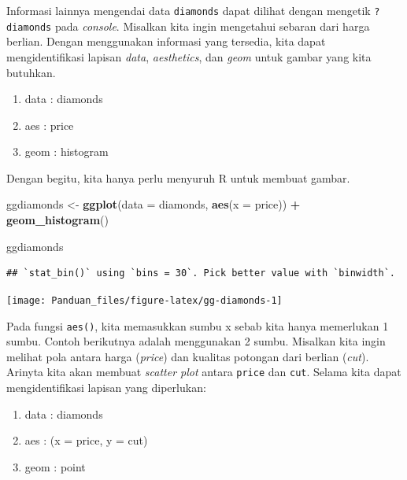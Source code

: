 \documentclass[]{book}
\newenvironment{Shaded}{\begin{snugshade}}{\end{snugshade}}
\newcommand{\KeywordTok}[1]{\textcolor[rgb]{0.13,0.29,0.53}{\textbf{#1}}}
\newcommand{\DataTypeTok}[1]{\textcolor[rgb]{0.13,0.29,0.53}{#1}}
\newcommand{\StringTok}[1]{\textcolor[rgb]{0.31,0.60,0.02}{#1}}
\newcommand{\OperatorTok}[1]{\textcolor[rgb]{0.81,0.36,0.00}{\textbf{#1}}}
\newcommand{\NormalTok}[1]{#1}
\providecommand{\tightlist}{%
  \setlength{\itemsep}{0pt}\setlength{\parskip}{0pt}}
\begin{document}
Informasi lainnya mengendai data \texttt{diamonds} dapat dilihat dengan
mengetik \texttt{?diamonds} pada \emph{console}. Misalkan kita ingin
mengetahui sebaran dari harga berlian. Dengan menggunakan informasi yang
tersedia, kita dapat mengidentifikasi lapisan \emph{data},
\emph{aesthetics}, dan \emph{geom} untuk gambar yang kita butuhkan.

\begin{enumerate}
\def\labelenumi{\arabic{enumi}.}
\tightlist
\item
  data : diamonds
\item
  aes : price
\item
  geom : histogram
\end{enumerate}

Dengan begitu, kita hanya perlu menyuruh R untuk membuat gambar.

\begin{Shaded}
\begin{Highlighting}[]
\NormalTok{ggdiamonds <-}\StringTok{ }\KeywordTok{ggplot}\NormalTok{(}\DataTypeTok{data =}\NormalTok{ diamonds, }\KeywordTok{aes}\NormalTok{(}\DataTypeTok{x =}\NormalTok{ price)) }\OperatorTok{+}
\StringTok{        }\KeywordTok{geom_histogram}\NormalTok{()}

\NormalTok{ggdiamonds}
\end{Highlighting}
\end{Shaded}

\begin{verbatim}
## `stat_bin()` using `bins = 30`. Pick better value with `binwidth`.
\end{verbatim}

\begin{center}\texttt{[image: Panduan\_files/figure-latex/gg-diamonds-1]} \end{center}

Pada fungsi \texttt{aes()}, kita memasukkan sumbu x sebab kita hanya
memerlukan 1 sumbu. Contoh berikutnya adalah menggunakan 2 sumbu.
Misalkan kita ingin melihat pola antara harga (\emph{price}) dan
kualitas potongan dari berlian (\emph{cut}). Arinyta kita akan membuat
\emph{scatter plot} antara \texttt{price} dan \texttt{cut}. Selama kita
dapat mengidentifikasi lapisan yang diperlukan:

\begin{enumerate}
\def\labelenumi{\arabic{enumi}.}
\tightlist
\item
  data : diamonds
\item
  aes : (x = price, y = cut)
\item
  geom : point
\end{enumerate}
\end{document}
